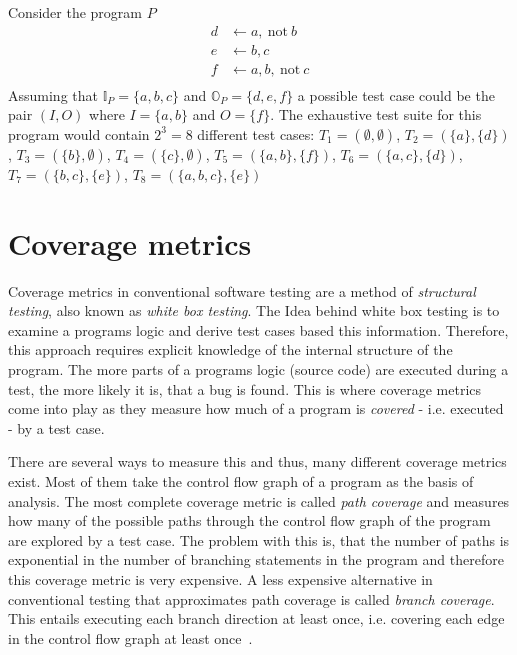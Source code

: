 \begin{example}
\label{ex:test suite}
    Consider the program $P$
    \begin{align*}
        d &\leftarrow a,\ \text{not}\ b \\
        e &\leftarrow b, c \\
        f &\leftarrow a, b,\ \text{not}\ c \\
    \end{align*}
    Assuming that \(\mathbb{I}_P = \{a, b, c\}\) and \(\mathbb{O}_P = \{d, e, f\}\) a possible test case could be the pair \((I, O)\) where \(I = \{a, b\}\) and \(O = \{f\}\).
    The exhaustive test suite for this program would contain \(2^3 = 8\) different test cases: \(T_1 = (\emptyset, \emptyset)\), \(T_2 = (\{a\}, \{d\})\), \(T_3 
 = (\{b\}, \emptyset)\), \(T_4 = (\{c\}, \emptyset)\), \(T_5 = (\{a, b\}, \{f\})\), \(T_6 = (\{a, c\}, \{d\})\), \(T_7 = (\{b, c\}, \{e\})\), \(T_8 = (\{a, b, c\}, \{e\})\)
\end{example}

\chapter{Coverage metrics}
\label{ch:Coverage metrics}
Coverage metrics in conventional software testing are a method of \emph{structural testing}, also known as \emph{white box testing}. The Idea behind white box testing is to examine a programs logic and derive test cases based this information. Therefore, this approach requires explicit knowledge of the internal structure of the program. The more parts of a programs logic (source code) are executed during a test, the more likely it is, that a bug is found. This is where coverage metrics come into play as they measure how much of a program is \emph{covered} - i.e. executed - by a test case.

There are several ways to measure this and thus, many different coverage metrics exist. Most of them take the control flow graph of a program as the basis of analysis. The most complete coverage metric is called \emph{path coverage} and measures how many of the possible paths through the control flow graph of the program are explored by a test case. The problem with this is, that the number of paths is exponential in the number of branching statements in the program and therefore this coverage metric is very expensive. A less expensive alternative in conventional testing that approximates path coverage is called \emph{branch coverage}. This entails executing each branch direction at least once, i.e. covering each edge in the control flow graph at least once~\cite[41\psqq]{MB12}.

